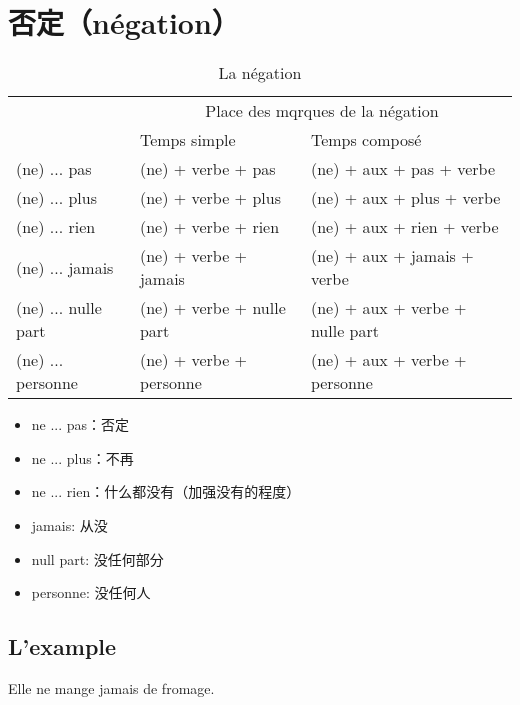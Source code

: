 
\chapter{否定（négation）}

\begin{table}[H]
  \centering
  \begin{tabular}[H]{p{}||p{}|p{}}
    \hline{}
    \multirow{2}{8em}{Marque de la négation} & \multicolumn{2}{c}{Place des mqrques de la négation} \\
    \cline{2-3}
                                             & Temps simple & Temps composé \\
    \hline

    (ne) ... pas & (ne) + verbe + pas & (ne) + aux + pas + verbe \\
    (ne) ... plus & (ne) + verbe + plus & (ne) + aux + plus + verbe \\
    (ne) ... rien & (ne) + verbe + rien & (ne) + aux + rien + verbe \\
    (ne) ... jamais & (ne) + verbe + jamais & (ne) + aux + jamais + verbe \\
    (ne) ... nulle part & (ne) + verbe + nulle part & (ne) + aux + verbe + {\color{red}nulle part} \\
    (ne) ... personne & (ne) + verbe + personne & (ne) + aux + verbe + {\color{red}personne}\\
    \hline
    
  \end{tabular}
  
  \caption{La négation}
\end{table}


\begin{itemize}
\item ne ... pas：否定
\item ne ... plus：不再
\item ne ... rien：什么都没有（加强没有的程度）
\item jamais: 从没
\item null part: 没任何部分
\item personne: 没任何人
\end{itemize}




\section{L'example}


Elle ne mange jamais de fromage.

